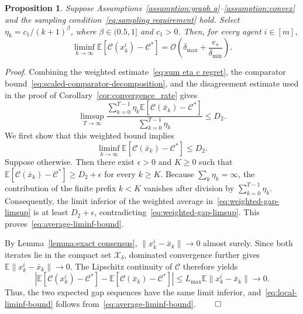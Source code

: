 \documentclass[twocolumn]{autart}    %
\newcommand{\order}[1]{\mathcal{O}\left(#1\right)}
\newcommand{\brk}[1]{\left[#1\right]}
\newtheorem{proposition}{Proposition}
\newcommand{\1}{\mathbf{1}}
\begin{document}
\begin{proposition}\label{prop:last-iterate-liminf}
Suppose Assumptions~\ref{assumption:graph q}--\ref{assumption:convex} and the sampling condition~\eqref{eq:sampling requirement} hold. Select $\eta_k=c_1/(k+1)^\beta$, where $\beta\in(0.5,1]$ and $c_1>0$. Then, for every agent $i\in[m]$,
\begin{equation}
\liminf_{k\to\infty}
\mathbb E\brk{\mathcal C(x_k^i)-\mathcal C^\ast}
 =\order{\delta_{\max}+\frac{e_s}{\delta_{\min}}}.
\label{eq:local-liminf-bound}
\end{equation}
\end{proposition}

\textit{Proof}. 
Combining the weighted estimate~\eqref{eq:sum eta c regret}, the comparator bound~\eqref{eq:scaled-comparator-decomposition}, and the disagreement estimate used in the proof of Corollary~\ref{cor:convergence_rate} gives
\begin{equation}
\limsup_{T\to\infty}
\frac{\sum_{k=0}^{T-1}\eta_k
\mathbb E\brk{\mathcal C(\bar x_k)-\mathcal C^\ast}}
{\sum_{k=0}^{T-1}\eta_k}
\leq D_2.
\label{eq:weighted-gap-limsup}
\end{equation}
We first show that this weighted bound implies
\begin{equation}
\liminf_{k\to\infty}
\mathbb E\brk{\mathcal C(\bar x_k)-\mathcal C^\ast}
\leq D_2.
\label{eq:average-liminf-bound}
\end{equation}
Suppose otherwise. Then there exist $\epsilon>0$ and $K\geq0$ such that
$\mathbb E[\mathcal C(\bar x_k)-\mathcal C^\ast]\geq D_2+\epsilon$ for every $k\geq K$. Because $\sum_k\eta_k=\infty$, the contribution of the finite prefix $k<K$ vanishes after division by $\sum_{k=0}^{T-1}\eta_k$. Consequently, the limit inferior of the weighted average in~\eqref{eq:weighted-gap-limsup} is at least $D_2+\epsilon$, contradicting~\eqref{eq:weighted-gap-limsup}. This proves~\eqref{eq:average-liminf-bound}.

By Lemma~\ref{lemma:exact consensus}, $\|x_k^i-\bar x_k\|\to0$ almost surely. Since both iterates lie in the compact set $\mathcal X_\delta$, dominated convergence further gives $\mathbb E\|x_k^i-\bar x_k\|\to0$. The Lipschitz continuity of $\mathcal C$ therefore yields
\begin{equation*}
\left|\mathbb E\brk{\mathcal C(x_k^i)-\mathcal C^\ast}
-\mathbb E\brk{\mathcal C(\bar x_k)-\mathcal C^\ast}\right|
\leq L_{\max}\mathbb E\|x_k^i-\bar x_k\|\to0.
\end{equation*}
Thus, the two expected gap sequences have the same limit inferior, and~\eqref{eq:local-liminf-bound} follows from~\eqref{eq:average-liminf-bound}.
\hfill $\qed$ 
\end{document}
